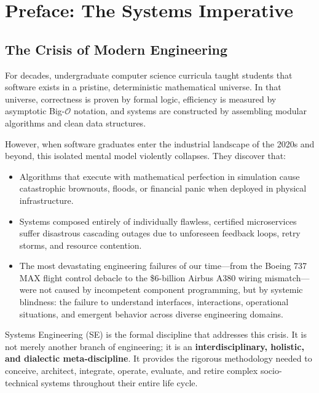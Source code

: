 \chapter*{Preface: The Systems Imperative}

\section*{The Crisis of Modern Engineering}
For decades, undergraduate computer science curricula taught students that software exists in a pristine, deterministic mathematical universe. In that universe, correctness is proven by formal logic, efficiency is measured by asymptotic Big-$\mathcal{O}$ notation, and systems are constructed by assembling modular algorithms and clean data structures.

However, when software graduates enter the industrial landscape of the 2020s and beyond, this isolated mental model violently collapses. They discover that:
\begin{itemize}[leftmargin=1.5em]
    \item Algorithms that execute with mathematical perfection in simulation cause catastrophic brownouts, floods, or financial panic when deployed in physical infrastructure.
    \item Systems composed entirely of individually flawless, certified microservices suffer disastrous cascading outages due to unforeseen feedback loops, retry storms, and resource contention.
    \item The most devastating engineering failures of our time---from the Boeing 737 MAX flight control debacle to the \$6-billion Airbus A380 wiring mismatch---were not caused by incompetent component programming, but by systemic blindness: the failure to understand interfaces, interactions, operational situations, and emergent behavior across diverse engineering domains.
\end{itemize}

Systems Engineering (SE) is the formal discipline that addresses this crisis. It is not merely another branch of engineering; it is an \textbf{interdisciplinary, holistic, and dialectic meta-discipline}. It provides the rigorous methodology needed to conceive, architect, integrate, operate, evaluate, and retire complex socio-technical systems throughout their entire life cycle.

